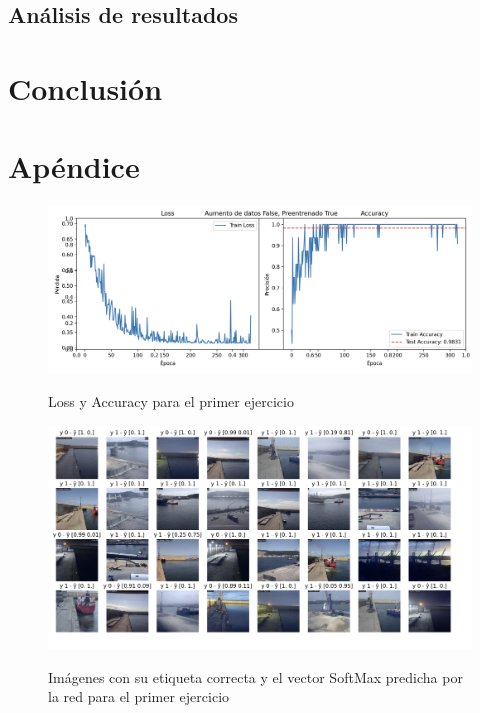 \documentclass{article}
\begin{document}
\subsection*{Análisis de resultados}

\section*{Conclusión}


\section*{Apéndice}

\begin{figure}[h]
	\centering
	\includegraphics[width=0.9\linewidth]{lossEj1}
	\label{fig:lossEj1}
	\caption{Loss y Accuracy para el primer ejercicio}
\end{figure}

\begin{figure}[h]
	\centering
	\includegraphics[width=0.8\linewidth]{imagenesEj1}
	\label{fig:imagenesEj1}
	\caption{Imágenes con su etiqueta correcta y el vector SoftMax predicha por la red para el primer ejercicio}
\end{figure}

\end{document}
